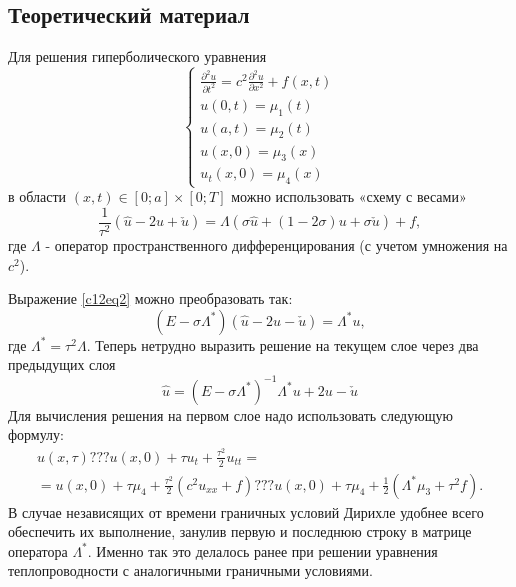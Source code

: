 \chapter{}

\section{Теоретический материал}
Для решения гиперболического уравнения
\begin{equation} \label{c12eq1}
	\begin{cases}
		\displaystyle \frac{\partial^2 u}{\partial t^2} = c^2 \frac{\partial^2 u}{\partial x^2} + f(x,t) \\
		u(0,t) = \mu_1(t) \\
		u(a,t) = \mu_2(t) \\
		u(x,0) = \mu_3(x) \\
		u_t(x,0) = \mu_4(x)
	\end{cases}
\end{equation}
в области $(x,t) \in [0; a] \times [0; T]$ можно использовать «схему с весами» 
\begin{equation} \label{c12eq2}
	\frac{1}{\tau^2} \left( \hat{u} - 2u + \check{u} \right) = \Lambda \left( \sigma \hat{u} + \left( 1 - 2 \sigma \right) u + \sigma \check{u} \right) + f,
\end{equation}
где $\Lambda$ - оператор пространственного дифференцирования (с учетом умножения на $c^2$).

Выражение \eqref{c12eq2} можно преобразовать так:
\begin{equation} \label{c12eq3}
	\left( E - \sigma \Lambda^* \right) \left( \hat{u} - 2u - \check{u} \right) = \Lambda^* u,
\end{equation}
где $\Lambda^* = \tau^2 \Lambda$. Теперь нетрудно выразить решение на текущем слое через два предыдущих слоя
\begin{equation} \label{c12eq4}
	\hat{u} = \left( E - \sigma \Lambda^* \right)^{-1} \Lambda^* u + 2u - \check{u}
\end{equation}
Для вычисления решения на первом слое надо использовать следующую формулу:
\begin{equation} \label{c12eq5}
	\begin{split}
		u(x,\tau) ??? u(x,0) + \tau u_t + \frac{\tau^2}{2} u_{tt} = \\
		= u(x,0) + \tau \mu_4 + \frac{\tau^2}{2} \left(c^2 u_{xx} + f \right) ??? u(x,0) + \tau \mu_4 + \frac{1}{2} \left( \Lambda^* \mu_3 + \tau^2 f \right).
	\end{split}
\end{equation}
В случае независящих от времени граничных условий Дирихле удобнее всего обеспечить их выполнение, занулив первую и последнюю строку в матрице оператора $\Lambda^*$. Именно так это делалось ранее при решении уравнения теплопроводности с аналогичными граничными условиями.

